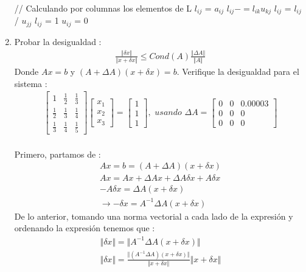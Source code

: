 \documentclass{article}
\begin{document}
\begin{enumerate}
\begin{algorithm}[H]
\begin{algorithmic}
		\State // Calculando por columnas los elementos de L
			\State $l_{ij}$ = $a_{ij}$
				\State $l_{ij} -= l_{ik} u_{kj}$
			\EndFor
			\State $l_{ij}$ = $l_{ij}$ / $u_{jj}$
		\ElsIf
			\State $l_{ij}$ = 1
		\Else
			\State $u_{ij}$ = 0
		\EndIf
		
	\EndFor
\EndFor
\end{algorithmic}
\end{algorithm}


\item Probar la desigualdad :
\begin{gather*}
\frac{ \Vert \delta x \Vert }{ \Vert x + \delta x \Vert } \leq Cond(A) \frac{ \Vert \Delta A \Vert }{ \Vert A \Vert }
\end{gather*}
Donde $Ax = b$ y $ ( A + \Delta A )( x + \delta x ) = b $.
Verifique la desigualdad para el sistema :
\begin{gather*}
\begin{bmatrix}
	    1 		& \frac{1}{2} & \frac{1}{3} \\
	\frac{1}{2} & \frac{1}{3} & \frac{1}{4} \\
	\frac{1}{3} & \frac{1}{4} & \frac{1}{5}
\end{bmatrix} 
	\begin{bmatrix}
		x_{1}\\
		x_{2}\\
		x_{3}
	\end{bmatrix} =
		\begin{bmatrix}
			1 \\
			1 \\
			1
		\end{bmatrix}
, \textit{ usando } \Delta A = 
	\begin{bmatrix}
		0 & 0 & 0.00003 \\
		0 & 0 & 0 \\
		0 & 0 & 0
	\end{bmatrix}
\end{gather*}
\\
Primero, partamos de :
\begin{gather*}
	Ax = b = ( A + \Delta A )( x + \delta x ) \\
	Ax = Ax + \Delta A x + \Delta A \delta x + A \delta x \\
	-A \delta x = \Delta A ( x + \delta x ) \\
	\rightarrow -\delta x = A^{-1}\Delta A ( x + \delta x )
\end{gather*}
De lo anterior, tomando una norma vectorial a cada lado de la expresi\'on y ordenando la expresi\'on tenemos que :
\begin{gather*}
\Vert \delta x \Vert = \Vert A^{-1}\Delta A ( x + \delta x ) \Vert \\
\Vert \delta x \Vert = 
		\frac{ \Vert ( A^{-1}\Delta A ) ( x + \delta x ) \Vert }{ \Vert x + \delta x \Vert }
			\Vert x + \delta x \Vert
\end{gather*}


\end{enumerate}
\end{document}
